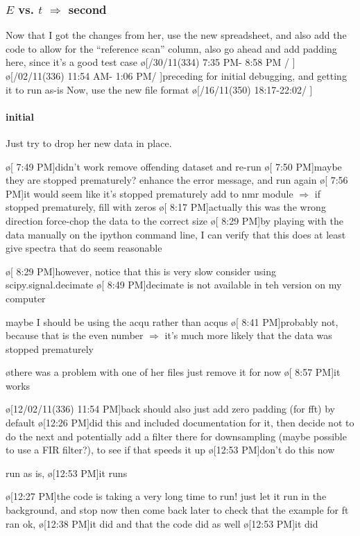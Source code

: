 \subsubsection{$E$ vs. $t$ $\Rightarrow$ second}\label{sec:writeup_software_examples_second}
Now that I got the changes from her, use the new spreadsheet, and also add the code to allow for the ``reference scan'' column, also go ahead and add padding here, since it's a good test case
\o[/30/11(334)  7:35 PM- 8:58 PM \obsts/ \obstd]{}
\o[/02/11(336) 11:54 AM- 1:06 PM\obsts/ \obstd]{preceding for initial debugging, and getting it to run as-is}
Now, use the new file format
\o[/16/11(350) 18:17-22:02\obsts/ \obstd]{}

\paragraph{initial}
Just try to drop her new data in place.
\begin{err}
    \o[ 7:49 PM]{didn't work}
    remove offending dataset and re-run
    \o[ 7:50 PM]{maybe they are stopped prematurely?}
    enhance the error message, and run again
    \o[ 7:56 PM]{it would seem like it's stopped prematurely}
    add to nmr module $\Rightarrow$ if stopped prematurely, fill with zeros
    \o[ 8:17 PM]{actually this was the wrong direction}
    force-chop the data to the correct size
    \o[ 8:29 PM]{by playing with the data manually on the ipython command line, I can verify that this does at least give spectra that do seem reasonable}
    \begin{err}
        \o[ 8:29 PM]{however, notice that this is very slow}
        consider using scipy.signal.decimate
        \o[ 8:49 PM]{decimate is not available in teh version on my computer}
    \end{err}
    maybe I should be using the acqu rather than acqus
    \o[ 8:41 PM]{probably not, because that is the even number $\Rightarrow$ it's much more likely that the data was stopped prematurely}
    \begin{err}
        \o{there was a problem with one of her files}
        just remove it for now
        \o[ 8:57 PM]{it works}
    \end{err}
    \o[12/02/11(336) 11:54 PM]{back}
    should also just add zero padding (for fft) by default
    \o[12:26 PM]{did this and included documentation for it, then decide not to do the next}
    and potentially add a filter there for downsampling (maybe possible to use a FIR filter?), to see if that speeds it up
    \o[12:53 PM]{don't do this now}
\end{err}
run as is,
\o[12:53 PM]{it runs}
\begin{err}
    \o[12:27 PM]{the code is taking a very long time to run!}
    just let it run in the background, and stop now
    then come back later to check that the example for ft ran ok,
    \o[12:38 PM]{it did}
    and that the code did as well
    \o[12:53 PM]{it did}
\end{err}
